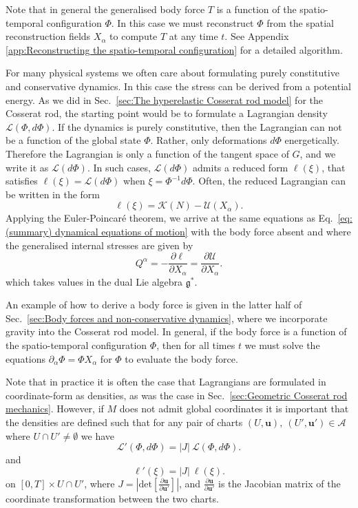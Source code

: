 Note that in general the generalised body force $T$ is a function of the spatio-temporal configuration $\Phi$. In this case we must reconstruct $\Phi$ from the spatial reconstruction fields $X_\alpha$ to compute $T$ at any time $t$. See Appendix \ref{app:Reconstructing the spatio-temporal configuration} for a detailed algorithm.

For many physical systems we often care about formulating purely constitutive and conservative dynamics. In this case the stress can be derived from a potential energy. As we did in Sec.~\ref{sec:The hyperelastic Cosserat rod model} for the Cosserat rod, the starting point would be to formulate a Lagrangian density $\mathcal{L}(\Phi, d \Phi)$. If the dynamics is purely constitutive, then the Lagrangian can not be a function of the global state $\Phi$. Rather, only deformations $d \Phi$ energetically. Therefore the Lagrangian is only a function of the tangent space of $G$, and we write it as $\mathcal{L}(d \Phi)$. In such cases, $\mathcal{L}(d \Phi)$ admits a reduced form $\ell(\xi)$, that satisfies $\ell(\xi) = \mathcal{L}(d \Phi)$ when $\xi = \Phi^{-1} d \Phi$. Often, the reduced Lagrangian can be written in the form
\begin{equation}
\ell(\xi) = \mathcal{K}(N) - \mathcal{U}(X_\alpha).
\end{equation}
Applying the Euler-Poincaré theorem, we arrive at the same equations as Eq.~\ref{eq:(summary) dynamical equations of motion} with the body force absent and where the generalised internal stresses are given by
\begin{equation}
Q^\alpha = - \frac{\partial \ell }{\partial X_\alpha} = \frac{\partial \mathcal{U}}{\partial X_\alpha}.
\end{equation}
which takes values in the dual Lie algebra $\mathfrak{g}^*$.

An example of how to derive a body force is given in the latter half of Sec.~\ref{sec:Body forces and non-conservative dynamics}, where we incorporate gravity into the Cosserat rod model. In general, if the body force is a function of the spatio-temporal configuration $\Phi$, then for all times $t$ we must solve the equations $\partial_\alpha \Phi = \Phi X_\alpha$ for $\Phi$ to evaluate the body force.

Note that in practice it is often the case that Lagrangians are formulated in coordinate-form as densities, as was the case in Sec.~\ref{sec:Geometric Cosserat rod mechanics}. However, if $M$ does not admit global coordinates it is important that the densities are defined such that for any pair of charts $(U, \mathbf{u}),\ (U', \mathbf{u}') \in \mathcal{A}$ where $U \cap U' \neq \emptyset$ we have
\begin{equation} 
\mathcal{L}'(\Phi, d \Phi) = |J|\ \mathcal{L}(\Phi, d \Phi).
\end{equation}
and
\begin{equation} 
\ell'(\xi) = |J|\ \ell(\xi).
\end{equation}
on $[0,T] \times U \cap U'$, where $J = \left| \text{det} \left[ \frac{\partial \mathbf{u} }{ \partial \mathbf{u}' } \right] \right|$, and $\frac{\partial \mathbf{u}}{ \partial \mathbf{u}' }$ is the Jacobian matrix of the coordinate transformation between the two charts.

